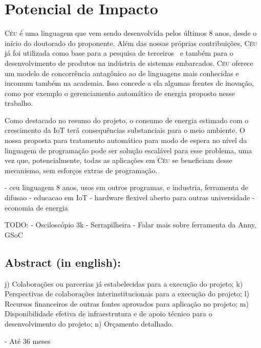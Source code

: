 \documentclass[titlepage,12pt]{article}
\newcommand{\CEU}{\textsc{C\'{e}u}\xspace}
\begin{document}
\section{ Potencial de Impacto }

\CEU é uma linguagem que vem sendo desenvolvida pelos últimos 8 anos, desde o
início do doutorado do proponente.
Além das nossas próprias contribuições, \CEU já foi utilizada como base para a
pesquisa de terceiros~\cite{ceu.terber} e também para o desenvolvimento de
produtos na indústria de sistemas embarcados.
\CEU oferece um modelo de concorrência antagônico ao de linguagens mais
conhecidas e incomum também na academia.
Isso concede a ela algumas frentes de inovação, como por exemplo o
gerenciamento automático de energia proposto nesse trabalho.

Como destacado no resumo do projeto, o consumo de energia estimado com o
crescimento da IoT terá consequências substanciais para o meio ambiente.
O nossa proposta para tratamento automático para modo de espera no nível da
linguagem de programação pode ser solução escalável para esse problema, uma vez
que, potencialmente, todas as aplicações em \CEU se beneficiam desse mecanismo,
sem esforços extras de programação.

- ceu linguagem 8 anos, usos em outros programas, e industria, ferramenta de difusao
- educacao em IoT
- hardware flexivel aberto para outras universidade
- economia de energia

TODO:
- Osciloscópio 3k
- Serrapilheira
- Falar mais sobre ferramenta da Anny, GSoC

\subsection{ Abstract (in english): }


j) Colaborações ou parcerias já estabelecidas para a execução do projeto;
k) Perspectivas de colaborações interinstitucionais para a execução do projeto;
l) Recursos financeiros de outras fontes aprovados para aplicação no projeto;
m) Disponibilidade efetiva de infraestrutura e de apoio técnico para o desenvolvimento do
projeto;
n) Orçamento detalhado.

- Até 36 meses


 
\end{document}
